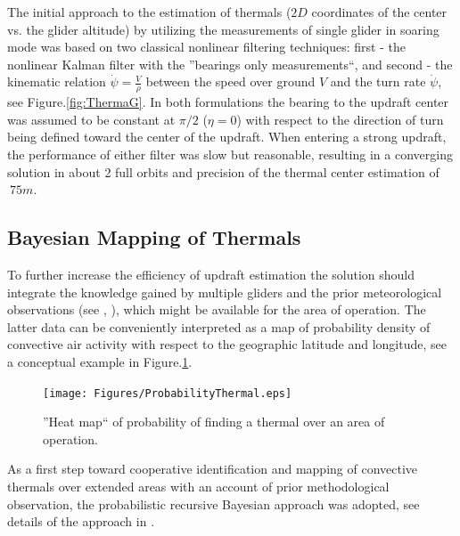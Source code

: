 \documentclass{ifacconf}
\newcommand{\squeezeup}{\vspace{-2.0mm}}
\begin{document}
The initial approach to the estimation of thermals ($2D$ coordinates of the center vs.
the glider altitude) by utilizing the measurements of single glider in soaring mode was
based on two classical nonlinear filtering techniques: first - the nonlinear Kalman
filter with the ''bearings only measurements``, and second - the kinematic relation
$\dot{\psi}=\frac{V}{\rho}$ between the speed over ground $V$ and the turn rate
$\dot{\psi}$, see Figure.\ref{fig:ThermaG}. In both formulations the bearing to the
updraft center was assumed to be constant at $\pi/2$ ($\eta=0$) with respect to the
direction of turn being defined toward the center of the updraft. When entering a strong
updraft, the performance of either filter was slow but reasonable, resulting in a
converging solution in about 2 full orbits and precision of the thermal center estimation
of $~75m$.
%

\subsection{Bayesian Mapping of Thermals}
\label{subsec:BayesianMapping}
\squeezeup

To further increase the efficiency of updraft estimation the solution should integrate
the knowledge gained by multiple gliders and the prior meteorological observations (see
\cite{Pennycuick:1998}, \cite{Hindman:2007}), which might be available for the area of
operation. The latter data can be conveniently interpreted as a map of probability
density of convective air activity with respect to the geographic latitude and longitude,
see a conceptual example in Figure.\ref{fig:HeatMap}.
\begin{figure}[thpb]
  \centering
  \texttt{[image: Figures/ProbabilityThermal.eps]}
  \caption{''Heat map`` of probability of finding a thermal over an area of operation.}
  \label{fig:HeatMap}
\end{figure}

As a first step toward cooperative identification and mapping of convective thermals over
extended areas with an account of prior methodological observation, the probabilistic
recursive Bayesian approach was adopted, see details of the approach in
\cite{Bergman:1999}.
\end{document}
